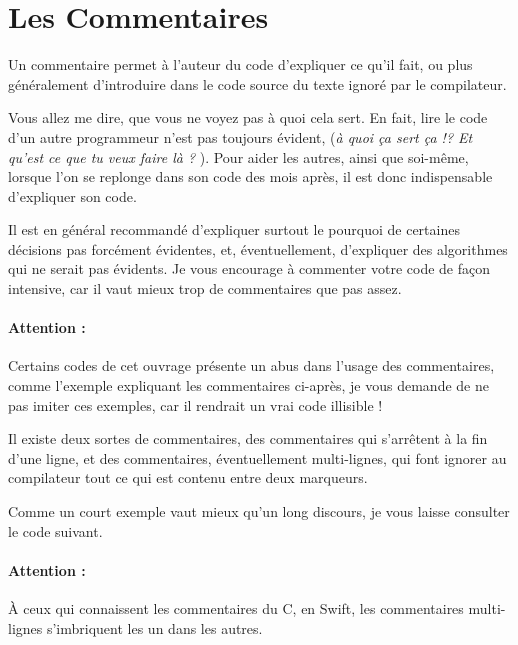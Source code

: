 \section{Les Commentaires}
Un commentaire permet à l’auteur du code d’expliquer ce qu’il fait,
ou plus généralement d’introduire dans le code source
du texte ignoré par le compilateur.

Vous allez me dire, que vous ne voyez pas à quoi cela sert.
En fait, lire le code d’un autre programmeur n’est pas toujours évident,
(\og \emph{à quoi ça sert ça !? Et qu’est ce que tu veux faire là ?} \fg{}).
Pour aider les autres, ainsi que soi-même,
lorsque l'on se replonge dans son code des mois après,
il est donc indispensable d’expliquer son code.

Il est en général recommandé d'expliquer surtout
le pourquoi de certaines décisions pas forcément évidentes,
et, éventuellement, d'expliquer des algorithmes qui ne serait pas évidents.
Je vous encourage à commenter votre code de façon intensive,
car il vaut mieux trop de commentaires que pas assez.

\paragraph{Attention :}
Certains codes de cet ouvrage présente un abus dans l'usage des commentaires,
comme l'exemple expliquant les commentaires ci-après,
je vous demande de ne pas imiter ces exemples,
car il rendrait un vrai code illisible !

Il existe deux sortes de commentaires,
des commentaires qui s'arrêtent à la fin d'une ligne,
et des commentaires, éventuellement multi-lignes,
qui font ignorer au compilateur tout ce qui est contenu entre deux marqueurs.

Comme un court exemple vaut mieux qu’un long discours,
je vous laisse consulter le code suivant.

\paragraph{Attention :} À ceux qui connaissent les commentaires du C,
en Swift, les commentaires multi-lignes s'imbriquent les un dans les autres.

